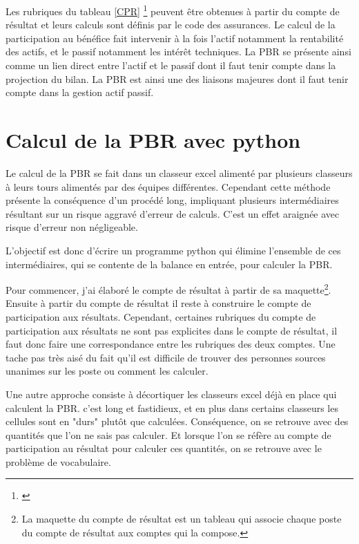 Les rubriques du tableau \ref{CPR} \footnote{\cite{Befec-PriceWaterhouse1996}} peuvent être obtenues à partir du compte de résultat et leurs calculs sont définis par le code des assurances.
Le calcul de la participation au bénéfice fait intervenir à la fois l'actif notamment la rentabilité des actifs, et le passif notamment les intérêt techniques. La PBR se présente ainsi comme un lien direct entre l'actif et le passif dont il faut tenir compte dans la projection du bilan. La PBR est ainsi une des liaisons majeures dont il faut tenir compte dans la gestion actif passif.

\section{Calcul de la PBR avec python}

Le calcul de la PBR se fait dans un classeur excel alimenté par plusieurs classeurs à leurs tours alimentés par des équipes différentes. Cependant cette méthode présente la conséquence d'un procédé long, impliquant plusieurs intermédiaires résultant sur un  risque aggravé d'erreur de calculs. C'est un effet araignée avec risque d'erreur non négligeable.

L'objectif est donc d'écrire un programme python qui élimine l'ensemble de ces intermédiaires, qui se contente de la balance en entrée, pour calculer la PBR.

Pour commencer, j'ai élaboré le compte de résultat à partir de sa maquette\footnote{La maquette du compte de résultat est un tableau qui associe chaque poste du compte de résultat aux comptes qui la compose.}. 
Ensuite à partir du compte de résultat il reste à construire le compte de participation aux résultats.
Cependant, certaines rubriques du compte de participation aux résultats ne sont pas explicites dans le compte de résultat, il faut donc faire une correspondance entre les rubriques des deux comptes. Une tache pas très aisé du fait qu'il est difficile de trouver des personnes sources unanimes sur les poste ou comment les calculer.

Une autre approche consiste à décortiquer les classeurs excel déjà en place qui calculent la PBR. c'est long et fastidieux, et en plus dans certains classeurs les cellules sont en "durs" plutôt que calculées. Conséquence, on se retrouve avec des quantités que l'on ne sais pas calculer. Et lorsque l'on se réfère au compte de participation au résultat pour calculer ces quantités, on se retrouve avec le problème de vocabulaire.

